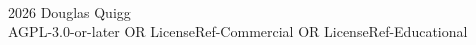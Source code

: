 \begin{titlepage}
  \centering
  \vfill
  {\Large{}} \\
  \vspace{2cm}
   \\
  \vspace{1cm}
  {\large{}} \\
  \vfill
   \\
   \\
  \vfill
   \\
  \vfill
  {\footnotesize \textcopyright{} 2026 Douglas Quigg \\
  AGPL-3.0-or-later OR LicenseRef-Commercial OR LicenseRef-Educational}
\end{titlepage}
